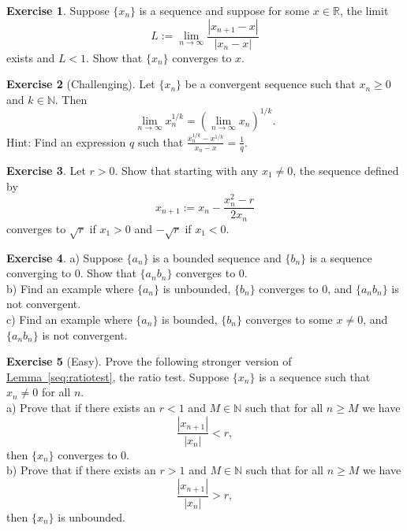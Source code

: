 \documentclass[12pt]{book}
\newcommand{\abs}[1]{\left\lvert {#1} \right\rvert}
\newcommand{\R}{{\mathbb{R}}}
\newcommand{\N}{{\mathbb{N}}}
\theoremstyle{plain}
\theoremstyle{remark}
\theoremstyle{definition}
\theoremstyle{exercise}
\newtheorem{exercise}{Exercise}[section]
\theoremstyle{example}
\newcommand{\lemmaref}[1]{\hyperref[#1]{Lemma~\ref*{#1}}}
\begin{document}
\begin{exercise}
Suppose $\{ x_n \}$ is a sequence and suppose for
some $x \in \R$, the limit
\begin{equation*}
L := \lim_{n \to \infty} \frac{\abs{x_{n+1}-x}}{\abs{x_n-x}}
\end{equation*}
exists and $L < 1$.  Show that $\{ x_n \}$ converges to $x$.
\end{exercise}

\begin{exercise}[Challenging]
Let $\{ x_n \}$ be a convergent sequence such
that $x_n \geq 0$ and $k \in \N$.
Then
\begin{equation*}
\lim_{n\to\infty} x_n^{1/k} =
{\left( \lim_{n\to\infty} x_n \right)}^{1/k} .
\end{equation*}
Hint: Find an expression $q$ such that $\frac{x_n^{1/k}-x^{1/k}}{x_n-x} =
\frac{1}{q}$.
\end{exercise}

\begin{exercise}
Let $r > 0$.  Show that starting with any $x_1 \not= 0$, the sequence
defined by
\begin{equation*}
x_{n+1} := x_n - \frac{x_n^2-r}{2x_n}
\end{equation*}
converges to $\sqrt{r}$ if $x_1 > 0$ and $-\sqrt{r}$ if $x_1 < 0$.
\end{exercise}

\begin{exercise}
a) Suppose $\{ a_n \}$ is a bounded sequence and $\{ b_n \}$ is a sequence
converging to 0. Show that $\{ a_n b_n \}$ converges to 0.\\
b) Find an example where $\{ a_n \}$ is unbounded, $\{ b_n \}$ converges to
0, and $\{ a_n b_n \}$ is not convergent.\\
c) Find an example where $\{ a_n \}$ is bounded, $\{ b_n \}$ converges to
some $x \not= 0$, and $\{ a_n b_n \}$ is not convergent.
\end{exercise}

\begin{exercise}[Easy] \label{exercise:strongerratiotest1}
Prove the following stronger version of \lemmaref{seq:ratiotest}, the ratio
test.  
Suppose $\{ x_n \}$ is a sequence such that $x_n \not= 0$ for all
$n$.
\\
a) Prove that if there exists an $r < 1$ and $M \in \N$ such that
for all $n \geq M$ we have
\begin{equation*}
\frac{\abs{x_{n+1}}}{\abs{x_n}} < r ,
\end{equation*}
then $\{ x_n \}$ converges to $0$.
\\
b) Prove that if there exists an $r > 1$ and $M \in \N$ such that
for all $n \geq M$ we have
\begin{equation*}
\frac{\abs{x_{n+1}}}{\abs{x_n}} > r ,
\end{equation*}
then $\{ x_n \}$ is unbounded.
\end{exercise}
\end{document}
